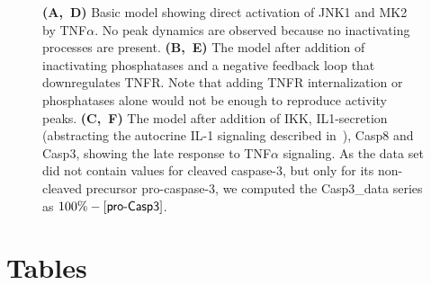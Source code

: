 \documentclass{bmcart}
\begin{document}
\begin{backmatter}
\begin{figure}[h!]
{{\bf(A,~D)} %
Basic model showing direct activation of JNK1 and MK2 by TNF$\alpha$.
No peak dynamics are observed because no inactivating processes are present.
{\bf(B,~E)} %
The model after addition of inactivating phosphatases and a negative feedback loop that downregulates TNFR. Note that adding TNFR internalization or phosphatases alone would not be enough to reproduce activity peaks.
{\bf(C,~F)} %
The model after addition of IKK, IL1-secretion (abstracting
the autocrine IL-1 signaling described in~\cite{pathway-autocrine}), Casp8 and Casp3, showing the late response to TNF$\alpha$ signaling.
As the data set did not contain values for cleaved caspase-3, but only for its non-cleaved precursor pro-caspase-3,
we computed the {\sf Casp3\_{}data} series as $100\% - [\mbox{\sf pro-Casp3}]$.\label{fig:small-model}}
\end{figure}







\clearpage
\section*{Tables}






\end{backmatter}
\end{document}

